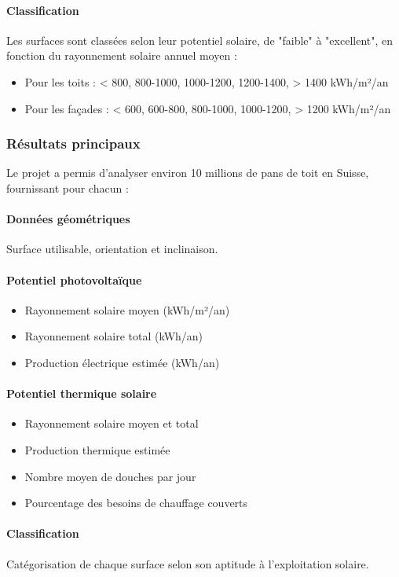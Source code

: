 \paragraph{Classification}
\par{Les surfaces sont classées selon leur potentiel solaire, de "faible" à "excellent", en fonction du rayonnement solaire annuel moyen :}
\begin{itemize}
    \item Pour les toits : < 800, 800-1000, 1000-1200, 1200-1400, > 1400 kWh/m²/an
    \item Pour les façades : < 600, 600-800, 800-1000, 1000-1200, > 1200 kWh/m²/an
\end{itemize}
\subsubsection{Résultats principaux}
\par{Le projet a permis d'analyser environ 10 millions de pans de toit en Suisse, fournissant pour chacun :}
\paragraph{Données géométriques} Surface utilisable, orientation et inclinaison.
\paragraph{Potentiel photovoltaïque}
\begin{itemize}
    \item Rayonnement solaire moyen (kWh/m²/an)
    \item Rayonnement solaire total (kWh/an)
    \item Production électrique estimée (kWh/an)
\end{itemize}
\paragraph{Potentiel thermique solaire}
\begin{itemize}
    \item Rayonnement solaire moyen et total
    \item Production thermique estimée
    \item Nombre moyen de douches par jour
    \item Pourcentage des besoins de chauffage couverts
\end{itemize}
\paragraph{Classification}
\par{Catégorisation de chaque surface selon son aptitude à l'exploitation solaire.}
